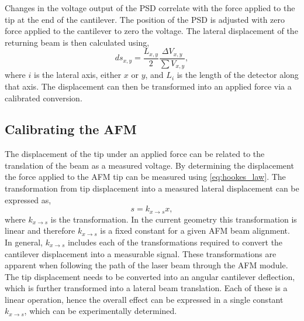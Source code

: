 \documentclass{article}
\begin{document}
Changes in the voltage output of the PSD correlate with the force applied to the tip at the end of the cantilever. The position of the PSD is adjusted with zero force applied to the cantilever to zero the voltage. The lateral displacement of the returning beam is then calculated using,
\begin{equation}
ds_{x,y} = \frac{L_{x,y}}{2}\frac{\Delta V_{x,y}}{\sum V_{x,y}},
\end{equation}
where $i$ is the lateral axis, either $x$ or $y$, and $L_i$ is the length of the detector along that axis. The displacement can then be transformed into an applied force via a calibrated conversion.

\subsection{Calibrating the AFM}

The displacement of the tip under an applied force can be related to the translation of the beam as a measured voltage. By determining the displacement the force applied to the AFM tip can be measured using \eqref{eq:hookes_law}. The transformation from tip displacement into a measured lateral displacement can be expressed as,
\begin{equation}
s = k_{x \rightarrow s}x,
\end{equation}
where $k_{x \rightarrow s}$ is the transformation. In the current geometry this transformation is linear and therefore $k_{x \rightarrow s}$ is a fixed constant for a given AFM beam alignment. In general, $k_{x \rightarrow s}$ includes each of the transformations required to convert the cantilever displacement into a measurable signal. These transformations are apparent when following the path of the laser beam through the AFM module. The tip displacement needs to be converted into an angular cantilever deflection, which is further transformed into a lateral beam translation. Each of these is a linear operation, hence the overall effect can be expressed in a single constant $k_{x \rightarrow s}$, which can be experimentally determined.
\end{document}
